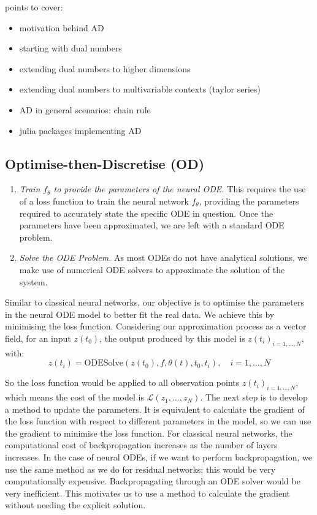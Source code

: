 \documentclass[a4paper,11pt,titlepage]{article}
\theoremstyle{definition}
\theoremstyle{plain}
\theoremstyle{remark}
\begin{document}
points to cover:
\begin{itemize}
    \item motivation behind AD
    \item starting with dual numbers
    \item extending dual numbers to higher dimensions
    \item extending dual numbers to multivariable contexts (taylor series)
    \item AD in general scenarios: chain rule
    \item julia packages implementing AD
\end{itemize}

\subsection{Optimise-then-Discretise (OD)}
\label{sec:od}

\begin{enumerate}
    \item \textit{Train $f_\theta$ to provide the parameters of the neural ODE.} This requires the use of a loss function to train the neural network $f_\theta$, providing the parameters required to accurately state the specific ODE in question. Once the parameters have been approximated, we are left with a standard ODE problem.
    \item \textit{Solve the ODE Problem.} As most ODEs do not have analytical solutions, we make use of numerical ODE solvers to approximate the solution of the system.
\end{enumerate}

Similar to classical neural networks, our objective is to optimise the parameters in the neural ODE model to better fit the real data. We achieve this by minimising the loss function. Considering our approximation process as a vector field, for an input
$z(t_0)$, the output produced by this model is $z(t_i)_{i=1,\dots,N}$, with:
$$z(t_i)=\mathrm{ODESolve}(z(t_0),f,\theta(t),t_0,t_i),\quad i=1,\dots,N$$

So the loss function would be applied to all observation points $z(t_i)_{i=1,\dots,N}$, which means the cost of the model is $\mathcal{L}(z_1,\dots,z_N)$. The next step is to develop a method to update the parameters. It is equivalent to calculate the gradient of the loss function with respect to different parameters in the model, so we can use the gradient to minimise the loss function. For classical neural networks, the computational cost of backpropagation increases as the number of layers increases. In the case of neural ODEs, if we want to perform backpropagation, we use the same method as we do for residual networks; this would be very computationally expensive. Backpropagating through an ODE solver would be very inefficient. This motivates us to use a method to calculate the gradient without needing the explicit solution.
\end{document}
